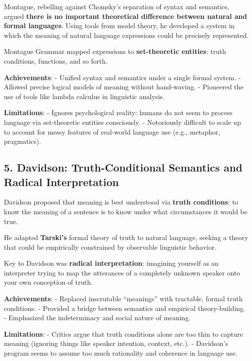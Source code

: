 \documentclass[12pt]{article}
\begin{document}
Montague, rebelling against Chomsky's separation of syntax and
semantics, argued \textbf{there is no important theoretical difference
between natural and formal languages}. Using tools from model theory, he
developed a system in which the meaning of natural language expressions
could be precisely represented.

Montague Grammar mapped expressions to \textbf{set-theoretic entities}:
truth conditions, functions, and so forth.

\textbf{Achievements}: - Unified syntax and semantics under a single
formal system. - Allowed precise logical models of meaning without
hand-waving. - Pioneered the use of tools like lambda calculus in
linguistic analysis.

\textbf{Limitations}: - Ignores psychological reality: humans do not
seem to process language via set-theoretic entities consciously. -
Notoriously difficult to scale up to account for messy features of
real-world language use (e.g., metaphor, pragmatics).

\hypertarget{davidson-truth-conditional-semantics-and-radical-interpretation}{%
\subsection{5. Davidson: Truth-Conditional Semantics and Radical
Interpretation}\label{davidson-truth-conditional-semantics-and-radical-interpretation}}

Davidson proposed that meaning is best understood via \textbf{truth
conditions}: to know the meaning of a sentence is to know under what
circumstances it would be true.

He adapted \textbf{Tarski's} formal theory of truth to natural language,
seeking a theory that could be empirically constrained by observable
linguistic behavior.

Key to Davidson was \textbf{radical interpretation}: imagining yourself
as an interpreter trying to map the utterances of a completely unknown
speaker onto your own conception of truth.

\textbf{Achievements}: - Replaced inscrutable ``meanings'' with
tractable, formal truth conditions. - Provided a bridge between
semantics and empirical theory-building. - Emphasized the indeterminacy
and social nature of meaning.

\textbf{Limitations}: - Critics argue that truth conditions alone are
too thin to capture meaning (ignoring things like speaker intention,
context, etc.). - Davidson's program seems to assume too much
rationality and coherence in language use.
\end{document}
